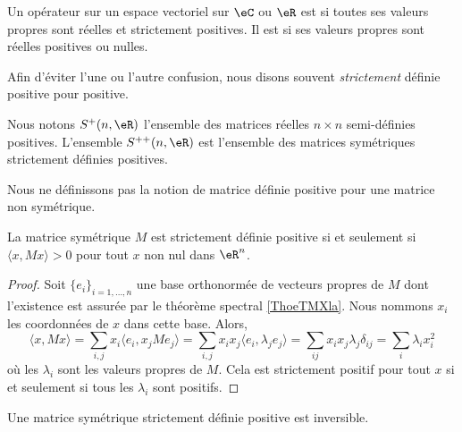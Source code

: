 \begin{definition}    \label{DefAWAooCMPuVM}
    Un opérateur sur un espace vectoriel sur \( \eC\) ou \( \eR\) est  si toutes ses valeurs propres sont réelles et strictement positives.  Il est  si ses valeurs propres sont réelles positives ou nulles.
\end{definition}
Afin d'éviter l'une ou l'autre confusion, nous disons souvent \emph{strictement} définie positive pour positive.

Nous notons \( S^+(n,\eR)\) l'ensemble des matrices réelles \( n\times n\) semi-définies positives. L'ensemble \( S^{++}(n,\eR)\) est l'ensemble des matrices symétriques strictement définies positives.

\begin{remark}
    Nous ne définissons pas la notion de matrice définie positive pour une matrice non symétrique.
\end{remark}

\begin{lemma}   \label{LemWZFSooYvksjw}
    La matrice symétrique \( M\) est strictement définie positive si et seulement si \( \langle x, Mx\rangle >0\) pour tout \( x\) non nul dans \( \eR^n\).
\end{lemma}

\begin{proof}
    Soit \( \{ e_i \}_{i=1,\ldots, n}\) une base orthonormée de vecteurs propres de \( M\) dont l'existence est assurée par le théorème spectral \ref{ThoeTMXla}. Nous nommons \( x_i\) les coordonnées de \( x\) dans cette base. Alors,
    \begin{equation}
        \langle x,Mx \rangle =\sum_{i,j}x_i\langle e_i, x_jMe_j\rangle =\sum_{i,j}x_ix_j\langle e_i, \lambda_je_j\rangle =\sum_{ij}x_ix_j\lambda_j\delta_{ij}=\sum_i\lambda_ix_i^2
    \end{equation}
    où les \( \lambda_i\) sont les valeurs propres de \( M\). Cela est strictement positif pour tout \( x\) si et seulement si tous les \( \lambda_i\) sont positifs.
\end{proof}

\begin{corollary}
    Une matrice symétrique strictement définie positive est inversible.
\end{corollary}

